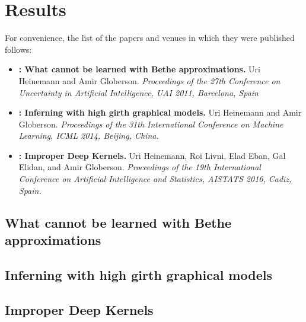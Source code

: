 \chapter{Results}
For convenience, the list of the papers and venues in which they were published follows:

\begin{itemize}
\item 
\textbf{: What cannot be learned with Bethe approximations.}
Uri Heinemann and  Amir Globerson.
\emph{Proceedings of the 27th Conference on Uncertainty in Artificial Intelligence, UAI 2011, Barcelona, Spain}

\item \textbf{: Inferning with high girth graphical models.}
Uri Heinemann and  Amir Globerson.
\emph{Proceedings of the 31th International Conference on Machine Learning, ICML 2014, Beijing, China.}

\item \textbf{: Improper Deep Kernels.}
Uri Heinemann, Roi Livni, Elad Eban, Gal Elidan, and Amir Globerson.
\emph{Proceedings of the 19th International Conference on Artificial Intelligence and Statistics, AISTATS 2016, Cadiz, Spain.}

\end{itemize} 


\newpage
\section{What cannot be learned with Bethe approximations}
\label{sec:lwbethe}

\newpage
\section{Inferning with high girth graphical models}
\label{sec:lg}

\newpage
\section{Improper Deep Kernels}
\label{sec:impnet}

